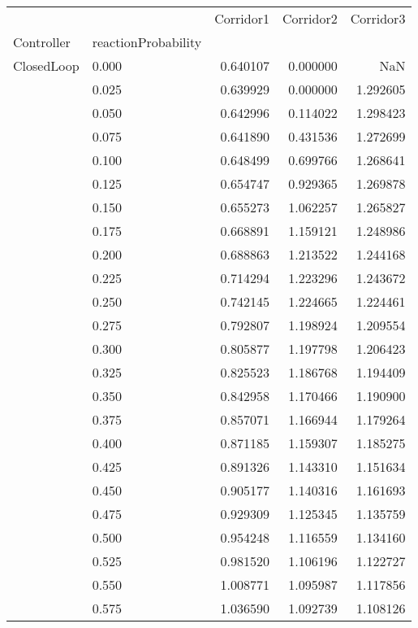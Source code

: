 \begin{tabular}{llrrr}
\toprule
         &       &  Corridor1 &  Corridor2 &  Corridor3 \\
Controller & reactionProbability &            &            &            \\
\midrule
ClosedLoop & 0.000 &   0.640107 &   0.000000 &        NaN \\
         & 0.025 &   0.639929 &   0.000000 &   1.292605 \\
         & 0.050 &   0.642996 &   0.114022 &   1.298423 \\
         & 0.075 &   0.641890 &   0.431536 &   1.272699 \\
         & 0.100 &   0.648499 &   0.699766 &   1.268641 \\
         & 0.125 &   0.654747 &   0.929365 &   1.269878 \\
         & 0.150 &   0.655273 &   1.062257 &   1.265827 \\
         & 0.175 &   0.668891 &   1.159121 &   1.248986 \\
         & 0.200 &   0.688863 &   1.213522 &   1.244168 \\
         & 0.225 &   0.714294 &   1.223296 &   1.243672 \\
         & 0.250 &   0.742145 &   1.224665 &   1.224461 \\
         & 0.275 &   0.792807 &   1.198924 &   1.209554 \\
         & 0.300 &   0.805877 &   1.197798 &   1.206423 \\
         & 0.325 &   0.825523 &   1.186768 &   1.194409 \\
         & 0.350 &   0.842958 &   1.170466 &   1.190900 \\
         & 0.375 &   0.857071 &   1.166944 &   1.179264 \\
         & 0.400 &   0.871185 &   1.159307 &   1.185275 \\
         & 0.425 &   0.891326 &   1.143310 &   1.151634 \\
         & 0.450 &   0.905177 &   1.140316 &   1.161693 \\
         & 0.475 &   0.929309 &   1.125345 &   1.135759 \\
         & 0.500 &   0.954248 &   1.116559 &   1.134160 \\
         & 0.525 &   0.981520 &   1.106196 &   1.122727 \\
         & 0.550 &   1.008771 &   1.095987 &   1.117856 \\
         & 0.575 &   1.036590 &   1.092739 &   1.108126 \\

\end{tabular}
